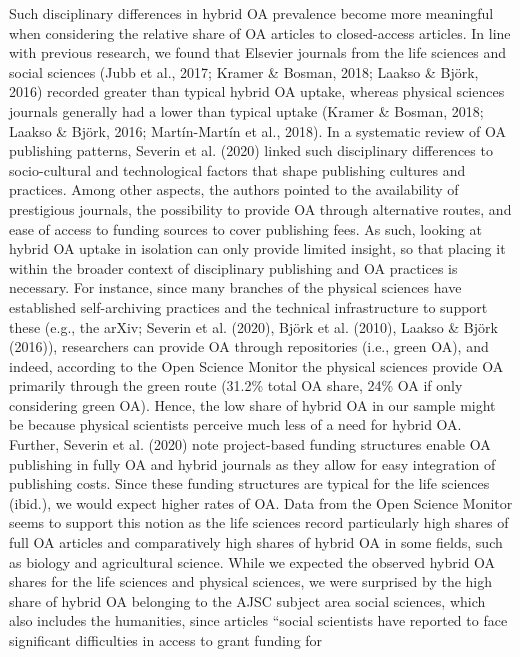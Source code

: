 \documentclass[a4paper,man,floatsintext,longtable,noextraspace,12pt]{apa6}
\begin{document}
Such disciplinary differences in hybrid OA prevalence become more
meaningful when considering the relative share of OA articles to
closed-access articles. In line with previous research, we found that
Elsevier journals from the life sciences and social sciences (Jubb et
al., 2017; Kramer \& Bosman, 2018; Laakso \& Björk, 2016) recorded
greater than typical hybrid OA uptake, whereas physical sciences
journals generally had a lower than typical uptake (Kramer \& Bosman,
2018; Laakso \& Björk, 2016; Martín-Martín et al., 2018). In a
systematic review of OA publishing patterns, Severin et al. (2020)
linked such disciplinary differences to socio-cultural and technological
factors that shape publishing cultures and practices. Among other
aspects, the authors pointed to the availability of prestigious
journals, the possibility to provide OA through alternative routes, and
ease of access to funding sources to cover publishing fees. As such,
looking at hybrid OA uptake in isolation can only provide limited
insight, so that placing it within the broader context of disciplinary
publishing and OA practices is necessary. For instance, since many
branches of the physical sciences have established self-archiving
practices and the technical infrastructure to support these (e.g., the
arXiv; Severin et al. (2020), Björk et al. (2010), Laakso \& Björk
(2016)), researchers can provide OA through repositories (i.e., green
OA), and indeed, according to the Open Science Monitor the physical
sciences provide OA primarily through the green route (31.2\% total OA
share, 24\% OA if only considering green OA). Hence, the low share of
hybrid OA in our sample might be because physical scientists perceive
much less of a need for hybrid OA. Further, Severin et al. (2020) note
project-based funding structures enable OA publishing in fully OA and
hybrid journals as they allow for easy integration of publishing costs.
Since these funding structures are typical for the life sciences
(ibid.), we would expect higher rates of OA. Data from the Open Science
Monitor seems to support this notion as the life sciences record
particularly high shares of full OA articles and comparatively high
shares of hybrid OA in some fields, such as biology and agricultural
science. While we expected the observed hybrid OA shares for the life
sciences and physical sciences, we were surprised by the high share of
hybrid OA belonging to the AJSC subject area social sciences, which also
includes the humanities, since articles ``social scientists have
reported to face significant difficulties in access to grant funding for
\end{document}

